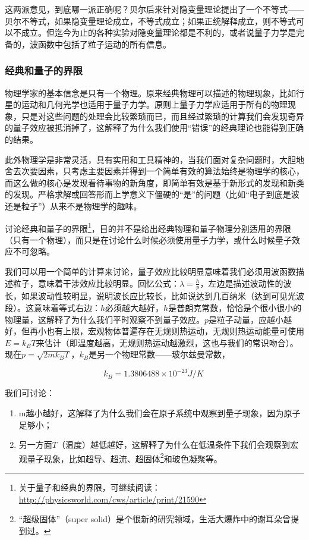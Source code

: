 这两派意见，到底哪一派正确呢？贝尔后来针对隐变量理论提出了一个不等式——贝尔不等式，如果隐变量理论成立，不等式成立；如果正统解释成立，则不等式可以不成立。但迄今为止的各种实验对隐变量理论都是不利的，或者说量子力学是完备的，波函数中包括了粒子运动的所有信息。

\subsubsection{经典和量子的界限}

物理学家的基本信念是只有一个物理。原来经典物理可以描述的物理现象，比如行星的运动和几何光学也适用于量子力学。原则上量子力学应适用于所有的物理现象，只是对这些问题的处理会比较繁琐而已，而且经过繁琐的计算我们会发现奇异的量子效应被抵消掉了，这解释了为什么我们使用“错误”的经典理论也能得到正确的结果。

此外物理学是非常灵活，具有实用和工具精神的，当我们面对复杂问题时，大胆地舍去次要因素，只考虑主要因素并得到一个简单有效的算法始终是物理学的核心，而这么做的核心是发现看待事物的新角度，即简单有效是基于新形式的发现和新类的发现。严格求解或回答形而上学意义下僵硬的“是”的问题（比如“电子到底是波还是粒子”）从来不是物理学的趣味。

讨论经典和量子的界限\footnote{关于量子和经典的界限，可继续阅读：\url{http://physicsworld.com/cws/article/print/21590}}，目的并不是给出经典物理和量子物理分别适用的界限（只有一个物理），而只是在讨论什么时候必须使用量子力学，或什么时候量子效应不可忽略。

我们可以用一个简单的计算来讨论，量子效应比较明显意味着我们必须用波函数描述粒子，意味着干涉效应比较明显。回忆公式：$\lambda = \frac{h}{p}$，左边是描述波动性的波长，如果波动性较明显，说明波长应比较长，比如说达到几百纳米（达到可见光波段）。这意味着等式右边：$h$必须越大越好，$h$是普朗克常数，恰恰是个很小很小的物理量，这解释了为什么我们平时观察不到量子效应。$p$是粒子动量，应越小越好，但再小也有上限，宏观物体普遍存在无规则热运动，无规则热运动能量可使用$E=k_B T$来估计（即温度越高，无规则热运动越激烈，这也与我们的常识吻合）。现在$p= \sqrt{2 m k_B T}$，$k_B$是另一个物理常数——玻尔兹曼常数，

\begin{equation}
k_B = 1.3806488 \times 10^{-23} J/K~
\end{equation}

我们可讨论：

\begin{enumerate}
\item 

m越小越好，这解释了为什么我们会在原子系统中观察到量子现象，因为原子足够小；

\item

另一方面$T$（温度）越低越好，这解释了为什么在低温条件下我们会观察到宏观量子现象，比如超导、超流、超固体\footnote{“超级固体”（super solid）是个很新的研究领域，生活大爆炸中的谢耳朵曾提到过。}和玻色凝聚等。

\end{enumerate}

